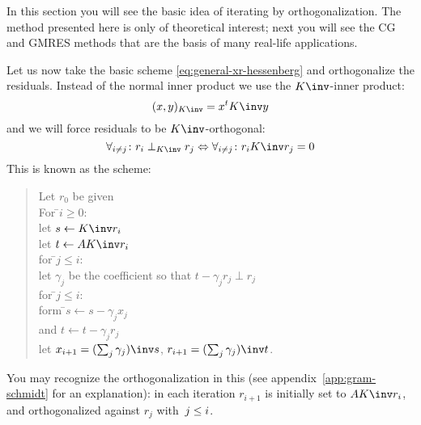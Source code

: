 In this section you will see the basic idea of iterating by
orthogonalization. The method presented here is only of theoretical
interest; next you will see the \acf{CG} and \acf{GMRES} methods that
are the basis of many real-life applications.

Let us now take the basic scheme \eqref{eq:general-xr-hessenberg} and
orthogonalize the residuals. Instead of the normal inner product we
use the $K\inv$-inner product:
\[ (x,y)_{K\inv} = x^tK\inv y \]
and we will force residuals to be $K\inv$-orthogonal:
\[ \forall_{i\not=j}\colon r_i\perp_{K\inv} r_j \Leftrightarrow
   \forall_{i\not=j}\colon r_iK\inv r_j=0
\]
This is known as the 
scheme:
\begin{quote}
  \begin{tabbing}
    Let $r_0$ be given\\
    For \=$i\geq 0$:\\
    \>let $s\leftarrow K\inv r_i$\\
    \>let $t\leftarrow AK\inv r_i$\\
    \>for \=$j\leq i$:\\
    \>\>let $\gamma_j$ be the coefficient so that $t-\gamma_jr_j\perp r_j$\\
    \>for \=$j\leq i$:\\
    \>\>form \=$s\leftarrow s-\gamma_jx_j$\\
    \>\>and  \>$t\leftarrow t-\gamma_jr_j$\\
    \>let $x_{i+1}=(\sum_j\gamma_j)\inv s$,
    $r_{i+1}=(\sum_j\gamma_j)\inv t$.\\
  \end{tabbing}
\end{quote}
You may recognize the  orthogonalization in
this (see appendix~\ref{app:gram-schmidt} for an explanation): in each
iteration $r_{i+1}$ is initially set to $AK\inv r_i$, and orthogonalized
against $r_j$ with~$j\leq\nobreak i$.


